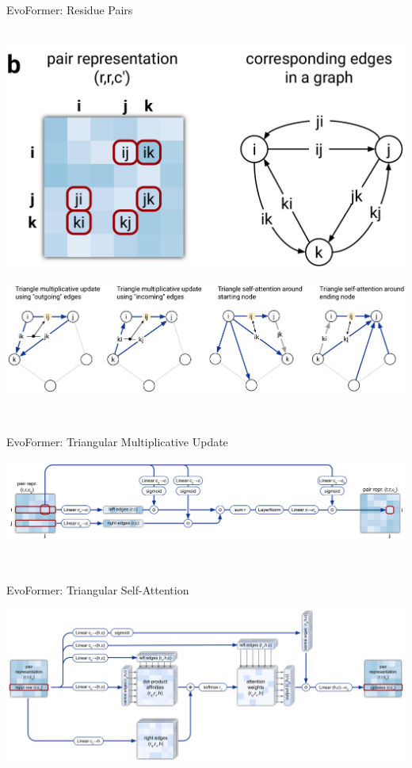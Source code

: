 \documentclass[presentation, smaller]{beamer}
\begin{document}
\begin{frame}[label={sec:org4cba8c0}]{EvoFormer: Residue Pairs}
\begin{center}~\includegraphics[scale=0.25]{./imgs/model-evoformer-pair1.png}
\end{center}
\begin{center}
\includegraphics[width=.9\linewidth]{./imgs/model-evoformer-pair2.png}
\end{center}~\cite{jumperHighlyAccurateProtein2021}
\end{frame}
\begin{frame}[label={sec:orgd80c696}]{EvoFormer: Triangular Multiplicative Update}
\begin{center}
\includegraphics[width=.9\linewidth]{./imgs/triangular-mult-update.png}
\end{center}~\cite{jumperHighlyAccurateProtein2021}
\end{frame}
\begin{frame}[label={sec:org5511a29}]{EvoFormer: Triangular Self-Attention}
\begin{center}
\includegraphics[width=.9\linewidth]{./imgs/triangular-self-attention.png}
\end{center}~\cite{jumperHighlyAccurateProtein2021}
\end{frame}
\end{document}
